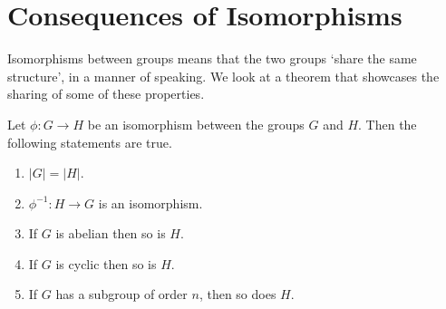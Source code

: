 \section{Consequences of Isomorphisms}
Isomorphisms between groups means that the two groups `share the same structure', in a manner of speaking. We look at a theorem that showcases the sharing of some of these properties.
\begin{theorem}\label{thrm-isomorphism-consequences}
    Let $\phi: G \to H$ be an isomorphism between the groups $G$ and $H$. Then the following statements are true.
    \begin{enumerate}
        \item $|G| = |H|$.
        \item $\phi^{-1}: H \to G$ is an isomorphism.
        \item If $G$ is abelian then so is $H$.
        \item If $G$ is cyclic then so is $H$.
        \item If $G$ has a subgroup of order $n$, then so does $H$.
    \end{enumerate}
\end{theorem}

